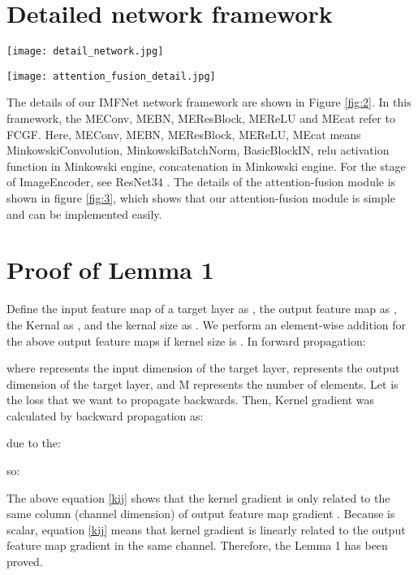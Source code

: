 \documentclass[10pt,twocolumn,letterpaper]{article}
\begin{document}
\section{Detailed network framework}
\label{5}
\begin{figure*}[htp]
	\centering
	\texttt{[image: detail\_network.jpg]}
	\caption{Detailed network framework of the proposed IMFNet.}
	\label{fig:2}
\end{figure*}

\begin{figure*}[htp]
	\centering
	\texttt{[image: attention\_fusion\_detail.jpg]}
	\caption{The details of attention-fusion module.  stands for matrix multiplication.  means the element multiplication, and  means the element addition.}
	\label{fig:3}
\end{figure*}

The details of our IMFNet network framework are shown in Figure \ref{fig:2}. In this framework, the MEConv, MEBN, MEResBlock, MEReLU and MEcat refer to FCGF. Here, MEConv, MEBN, MEResBlock, MEReLU, MEcat means MinkowskiConvolution, MinkowskiBatchNorm, BasicBlockIN, relu activation function in Minkowski engine, concatenation in Minkowski engine.  For the stage of ImageEncoder, see ResNet34 \cite{he2016deep}. The details of the attention-fusion module is shown in figure \ref{fig:3}, which shows that our attention-fusion module is simple and can be implemented easily.

\section{Proof of Lemma 1}
\label{6}
Define the input feature map of a target layer as , the output feature map as , the Kernal as  , and the kernal size as . We perform an element-wise addition for the above  output feature maps if kernel size is . In forward propagation:

where  represents the input dimension of the target layer,  represents the output dimension of the target layer, and M represents the number of elements. Let  is the loss that we want to propagate backwards. Then, Kernel gradient was calculated by backward propagation as:



due to the:



so:


The above equation \ref{kij} shows that the kernel gradient  is only related to the same  column (channel dimension) of output feature map gradient . Because  is scalar, equation \ref{kij} means that kernel gradient is linearly related to the output feature map gradient  in the same channel. Therefore, the Lemma 1 has been proved.
\end{document}
